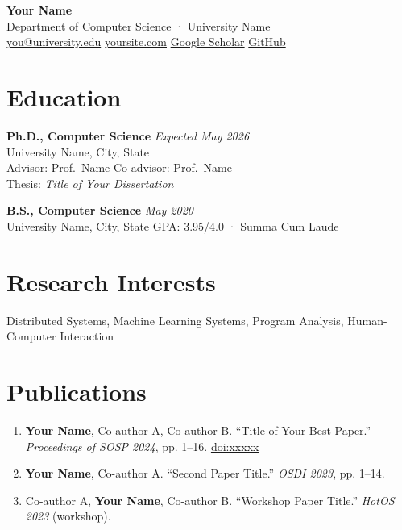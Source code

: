 \documentclass[11pt, a4paper]{article}
\begin{document}
\begin{center}
  {\LARGE\textbf{Your Name}}\\[5pt]
  Department of Computer Science · University Name\\[3pt]
  \small
  \href{mailto:you@university.edu}{you@university.edu} \quad
  \href{https://yoursite.com}{yoursite.com} \quad
  \href{https://scholar.google.com/citations?user=XXXXX}{Google Scholar} \quad
  \href{https://github.com/you}{GitHub}
\end{center}

\section{Education}

\noindent\textbf{Ph.D., Computer Science} \hfill \textit{Expected May 2026}\\
University Name, City, State\\
Advisor: Prof.\ Name \quad Co-advisor: Prof.\ Name\\
Thesis: \textit{Title of Your Dissertation}

\vspace{5pt}
\noindent\textbf{B.S., Computer Science} \hfill \textit{May 2020}\\
University Name, City, State \quad GPA: 3.95/4.0 · Summa Cum Laude

\section{Research Interests}

Distributed Systems, Machine Learning Systems, Program Analysis, Human-Computer Interaction

\section{Publications}

\begin{enumerate}[leftmargin=*, noitemsep, topsep=2pt]
  \item \textbf{Your Name}, Co-author A, Co-author B.
    ``Title of Your Best Paper.''
    \textit{Proceedings of SOSP 2024}, pp. 1--16.
    \href{https://doi.org/xxxxx}{doi:xxxxx}

  \item \textbf{Your Name}, Co-author A.
    ``Second Paper Title.''
    \textit{OSDI 2023}, pp. 1--14.

  \item Co-author A, \textbf{Your Name}, Co-author B.
    ``Workshop Paper Title.''
    \textit{HotOS 2023} (workshop).
\end{enumerate}
\end{document}
